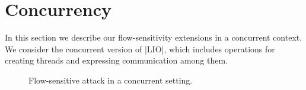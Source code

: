 \section{Concurrency}

In this section we describe our flow-sensitivity extensions in a
concurrent context. We consider the concurrent version of |LIO|, which
includes operations for creating threads and expressing communication
among them.

\begin{figure*}[!ht]
\vspace*{-5pt}
\caption{Flow-sensitive attack in a concurrent setting.\label{fig:fs-conc-attack}}
\vspace*{-5pt}
\end{figure*}
